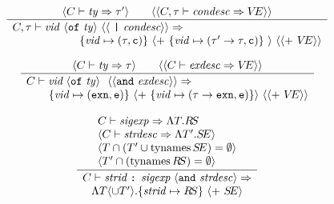 \begin{equation}         %
\frac{\langle\C\ts\ty\ra\tau'\rangle\qquad
      \langle\langle\C,\tau\ts\condesc\ra\VE\rangle\rangle }
     {\begin{array}{l}
      \C,\tau\ts\longcondescription\ra\\
     \qquad\qquad\qquad\{\vid\mapsto(\tau,\cstatus)\}\
     \langle +\ \{\vid\mapsto(\tau'\to\tau,\cstatus)\}\ \rangle\
      \langle\langle +\ \VE\rangle\rangle
      \end{array}
     }\index{43.35}
\end{equation}

\begin{equation}         %
\label{exndesc-rule}
\frac{ \langle\C\ts\ty\ra\tau\rangle\qquad
       \langle\langle\C\ts\exndesc\ra\VE\rangle\rangle }
     { \begin{array}{l}
        \C\ts\exndescriptiona\ra\\
        \quad\quad\{\vid\mapsto(\EXCN,\estatus)\}\ \langle +\ \{\vid\mapsto(\tau\to\EXCN,\estatus)\}\rangle\ \langle\langle +\ \VE\rangle\rangle 
       \end{array}
     }\index{43.4}
\end{equation}

\begin{equation}
\label{strdesc-rule}
\frac{\begin{array}{l}
       C\vdash{\it sigexp}\Rightarrow\Lambda{\ensuremath{T}}{.}{\ensuremath{R\!S}}\\
       \langle C\vdash{\it strdesc}\Rightarrow\Lambda{\ensuremath{T}'}{.}{\ensuremath{S\!E}} \rangle \\
       \langle T \cap (T' \cup \mathop{\rm tynames}\nolimits S\!E) = \emptyset \rangle\\
       \langle T' \cap (\mathop{\rm tynames}\nolimits R\!S) = \emptyset \rangle
       \end{array}}
     {\begin{array}{c}
       C\vdash\mbox{{\it strid}\ {\tt :} {\it sigexp}\ $\langle{\tt and}\ {\it strdesc}\rangle$}\Rightarrow\\
         \Lambda{\ensuremath{T}\langle\cup\ensuremath{T}'\rangle}{.}{\{{\it strid}\mapsto\ensuremath{R\!S}\}\ \langle +\ \ensuremath{S\!E}\rangle}
        \end{array}
     } 
\end{equation}

